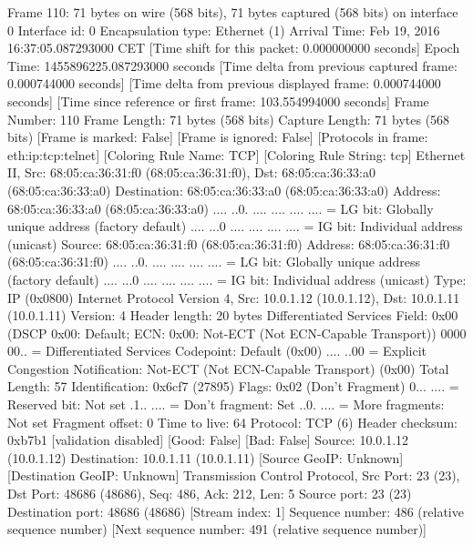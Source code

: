 Frame 110: 71 bytes on wire (568 bits), 71 bytes captured (568 bits) on interface 0
    Interface id: 0
    Encapsulation type: Ethernet (1)
    Arrival Time: Feb 19, 2016 16:37:05.087293000 CET
    [Time shift for this packet: 0.000000000 seconds]
    Epoch Time: 1455896225.087293000 seconds
    [Time delta from previous captured frame: 0.000744000 seconds]
    [Time delta from previous displayed frame: 0.000744000 seconds]
    [Time since reference or first frame: 103.554994000 seconds]
    Frame Number: 110
    Frame Length: 71 bytes (568 bits)
    Capture Length: 71 bytes (568 bits)
    [Frame is marked: False]
    [Frame is ignored: False]
    [Protocols in frame: eth:ip:tcp:telnet]
    [Coloring Rule Name: TCP]
    [Coloring Rule String: tcp]
Ethernet II, Src: 68:05:ca:36:31:f0 (68:05:ca:36:31:f0), Dst: 68:05:ca:36:33:a0 (68:05:ca:36:33:a0)
    Destination: 68:05:ca:36:33:a0 (68:05:ca:36:33:a0)
        Address: 68:05:ca:36:33:a0 (68:05:ca:36:33:a0)
        .... ..0. .... .... .... .... = LG bit: Globally unique address (factory default)
        .... ...0 .... .... .... .... = IG bit: Individual address (unicast)
    Source: 68:05:ca:36:31:f0 (68:05:ca:36:31:f0)
        Address: 68:05:ca:36:31:f0 (68:05:ca:36:31:f0)
        .... ..0. .... .... .... .... = LG bit: Globally unique address (factory default)
        .... ...0 .... .... .... .... = IG bit: Individual address (unicast)
    Type: IP (0x0800)
Internet Protocol Version 4, Src: 10.0.1.12 (10.0.1.12), Dst: 10.0.1.11 (10.0.1.11)
    Version: 4
    Header length: 20 bytes
    Differentiated Services Field: 0x00 (DSCP 0x00: Default; ECN: 0x00: Not-ECT (Not ECN-Capable Transport))
        0000 00.. = Differentiated Services Codepoint: Default (0x00)
        .... ..00 = Explicit Congestion Notification: Not-ECT (Not ECN-Capable Transport) (0x00)
    Total Length: 57
    Identification: 0x6cf7 (27895)
    Flags: 0x02 (Don't Fragment)
        0... .... = Reserved bit: Not set
        .1.. .... = Don't fragment: Set
        ..0. .... = More fragments: Not set
    Fragment offset: 0
    Time to live: 64
    Protocol: TCP (6)
    Header checksum: 0xb7b1 [validation disabled]
        [Good: False]
        [Bad: False]
    Source: 10.0.1.12 (10.0.1.12)
    Destination: 10.0.1.11 (10.0.1.11)
    [Source GeoIP: Unknown]
    [Destination GeoIP: Unknown]
Transmission Control Protocol, Src Port: 23 (23), Dst Port: 48686 (48686), Seq: 486, Ack: 212, Len: 5
    Source port: 23 (23)
    Destination port: 48686 (48686)
    [Stream index: 1]
    Sequence number: 486    (relative sequence number)
    [Next sequence number: 491    (relative sequence number)]
